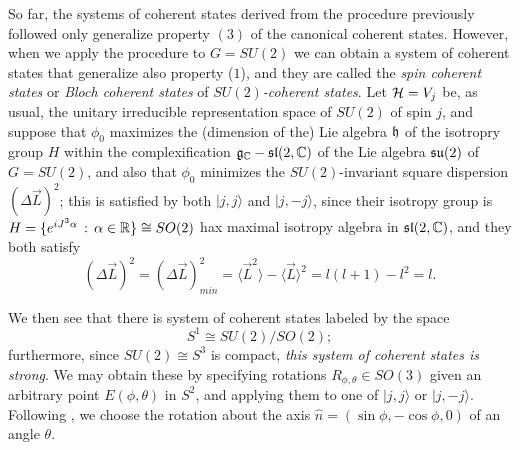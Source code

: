 




So far, the systems of coherent states derived from the procedure previously followed only generalize property $(3)$ of the canonical coherent states. However, when we apply the procedure to $G = SU(2)$ we can obtain a system of coherent states that generalize also property ($1$), and they are called the \emph{spin coherent states} or \emph{Bloch coherent states} of \emph{$SU(2)$-coherent states}. Let $\mathcal H = V_j$ be, as usual, the unitary irreducible representation space of $SU(2)$ of spin $j$, and suppose that $\phi_0$ maximizes the (dimension of the) Lie algebra $\mathfrak{h}$ of the isotropry group $H$ within the complexification $\mathfrak{g}_{\mathbb{C}} - \mathfrak{sl}(2, \mathbb{C})$ of the Lie algebra $\mathfrak{su}(2)$ of $G = SU(2)$, and also that $\phi_0$ minimizes the $SU(2)$-invariant square dispersion $(\Delta \vec L)^2$; this is satisfied by both $|j, j\rangle$ and $|j, -j\rangle$, since their isotropy group is $H = \{e^{iJ^3 \alpha} \, : \, \alpha \in \mathbb{R}\} \cong SO(2)$ hax maximal isotropy algebra in $\mathfrak{sl}(2, \mathbb{C})$, and they both satisfy 
\begin{equation}
    (\Delta \vec L)^2 = (\Delta \vec L)^2_{min} = \langle \vec L^2 \rangle - \langle \vec L \rangle ^2 = l(l+1) - l^2 = l.
\end{equation}

We then see that there is system of coherent states labeled by the space
\begin{equation}
    S^1 \cong SU(2) / SO(2);
\end{equation}
furthermore, since $SU(2) \cong S^3$ is compact, \textit{this system of coherent states is strong}. We may obtain these by specifying rotations $R_{\phi, \theta} \in SO(3)$ given an arbitrary point $E(\phi, \theta)$ in $S^2$, and applying them to one of $|j, j \rangle$ or $|j, -j\rangle$. Following \cite{Arecchi}, we choose the rotation about the axis $\hat n = (\sin \phi, -\cos \phi, 0)$ of an angle $\theta$.

